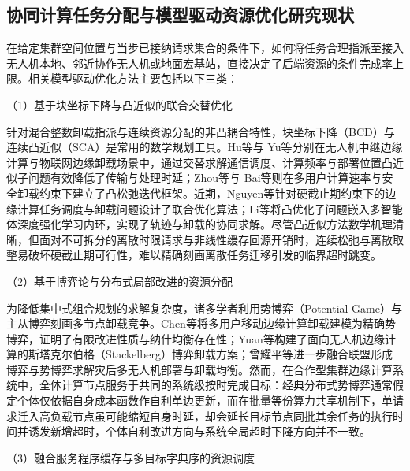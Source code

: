 \subsection{协同计算任务分配与模型驱动资源优化研究现状}
\label{sec:ch1-model-based}

在给定集群空间位置与当步已接纳请求集合的条件下，如何将任务合理指派至接入无人机本地、邻近协作无人机或地面宏基站，直接决定了后端资源的条件完成率上限\cite{skaltsis2023allocation,wang2020edge}。相关模型驱动优化方法主要包括以下三类：

（1）基于块坐标下降与凸近似的联合交替优化

针对混合整数卸载指派与连续资源分配的非凸耦合特性，块坐标下降（BCD）与连续凸近似（SCA）是常用的数学规划工具。Hu等与 Yu等分别在无人机中继边缘计算与物联网边缘卸载场景中，通过交替求解通信调度、计算频率与部署位置凸近似子问题有效降低了传输与处理时延；Zhou等与 Bai等则在多用户计算速率与安全卸载约束下建立了凸松弛迭代框架。近期，Nguyen等针对硬截止期约束下的边缘计算任务调度与卸载问题设计了联合优化算法；Li等将凸优化子问题嵌入多智能体深度强化学习内环，实现了轨迹与卸载的协同求解。尽管凸近似方法数学机理清晰，但面对不可拆分的离散时限请求与非线性缓存回源开销时，连续松弛与离散取整易破坏硬截止期可行性，难以精确刻画离散任务迁移引发的临界超时跳变。

（2）基于博弈论与分布式局部改进的资源分配

为降低集中式组合规划的求解复杂度，诸多学者利用势博弈（Potential Game）\cite{monderer1996potential}与主从博弈刻画多节点卸载竞争。Chen等将多用户移动边缘计算卸载建模为精确势博弈，证明了有限改进性质与纳什均衡存在性；Yuan等构建了面向无人机边缘计算的斯塔克尔伯格（Stackelberg）博弈卸载方案；曾耀平等进一步融合联盟形成博弈与势博弈求解灾后多无人机部署与卸载均衡。然而，在合作型集群边缘计算系统中，全体计算节点服务于共同的系统级按时完成目标：经典分布式势博弈通常假定个体仅依据自身成本函数作自利单边更新，而在批量等份算力共享机制下，单请求迁入高负载节点虽可能缩短自身时延，却会延长目标节点同批其余任务的执行时间并诱发新增超时，个体自利改进方向与系统全局超时下降方向并不一致。

（3）融合服务程序缓存与多目标字典序的资源调度


